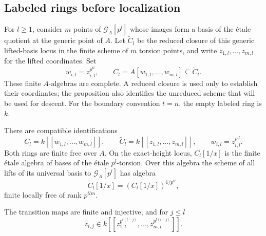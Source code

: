 \subsection{Labeled rings before localization}

For $l\geq1$, consider $m$ points of $\mathcal G_A[p^l]$ whose
images form a basis of the \'etale quotient at the generic point of
$A$.  Let $\widetilde C_l$ be the reduced closure of this generic
lifted-basis locus in the finite scheme of $m$ torsion points, and
write $z_{1,l},\ldots,z_{m,l}$ for the lifted coordinates.  Set
\[
 w_{i,l}=z_{i,l}^{p^{tl}},\qquad
 C_l=A[w_{1,l},\ldots,w_{m,l}]\subseteq\widetilde C_l.
\]
These finite $A$-algebras are complete.  A reduced closure is used
only to establish their coordinates; the proposition also identifies
the unreduced scheme that will be used for descent.
For the boundary convention $t=n$, the empty labeled ring is $k$.

\begin{proposition}\label{prop:finite-rings}
There are compatible identifications
\begin{equation}\label{rings:regular-coordinates}
 C_l=k[[w_{1,l},\ldots,w_{m,l}]],\qquad
 \widetilde C_l=k[[z_{1,l},\ldots,z_{m,l}]],\qquad
 w_{i,l}=z_{i,l}^{p^{tl}}.
\end{equation}
Both rings are finite free over $A$.  On the exact-height locus,
$C_l[1/x]$ is the finite \'etale algebra of bases of the \'etale
$p^l$-torsion.  Over this algebra the scheme of all lifts of its
universal basis to $\mathcal G_A[p^l]$ has algebra
\[
 \widetilde C_l[1/x]=(C_l[1/x])^{1/p^{tl}},
\]
finite locally free of rank $p^{tlm}$.

The transition maps are finite and injective, and for $j\leq l$
\begin{equation}\label{rings:transition-powers}
 z_{i,j}\in
 k[[z_{1,l}^{p^{t(l-j)}},\ldots,z_{m,l}^{p^{t(l-j)}}]].
\end{equation}
\end{proposition}

